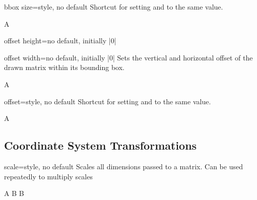 \begin{docDmKey}{bbox size}{=}{style, no default}
    Shortcut for setting  and
     to the same value.
    \begin{dispExample}

        \drawmatrix[bbox size=1.5]A
    \end{dispExample}
\end{docDmKey}

\begin{docDmKey}[][docmulti]{offset height}{=}{no default, initially |0|}
\end{docDmKey}
\begin{docDmKey}{offset width}{=}{no default, initially |0|}
    Sets the vertical and horizontal offset of the drawn matrix within its
    bounding box.
    \begin{dispExample}

       \drawmatrix[bbox size=2, offset width=.5, offset height=.75]A
    \end{dispExample}
\end{docDmKey}

\begin{docDmKey}{offset}{=}{style, no default}
    Shortcut for setting  and
     to the same value.
    \begin{dispExample}

       \drawmatrix[bbox size=2, offset=.5]A
    \end{dispExample}
\end{docDmKey}


\subsection{Coordinate System Transformations}

\begin{docDmKey}{scale}{=}{style, no default}
    Scales all dimensions passed to a matrix.  Can be used repeatedly to
    multiply scales
    \begin{dispExample}
        \drawmatrix[scale=.6]A 
        \drawmatrix[scale=.6, width=.5]B
        \drawmatrix[scale=.7, scale=.7]B
    \end{dispExample}
\end{docDmKey}

